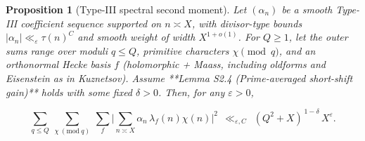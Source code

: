 \documentclass[11pt]{article}
\newtheorem{proposition}[lemma]{Proposition}
\theoremstyle{definition}
\theoremstyle{remark}
\begin{document}
\begin{proposition}[Type-III spectral second moment]\label{prop:typeIII}
	Let $(\alpha_n)$ be a smooth Type-III coefficient sequence supported on $n\asymp X$, with divisor-type bounds $|\alpha_n|\ll_\varepsilon \tau(n)^C$ and smooth weight of width $X^{1+o(1)}$. For $Q\ge 1$, let the outer sums range over moduli $q\le Q$, primitive characters $\chi\pmod q$, and an orthonormal Hecke basis $f$ (holomorphic + Maass, including oldforms and Eisenstein as in Kuznetsov). Assume **Lemma S2.4 (Prime-averaged short-shift gain)** holds with some fixed $\delta>0$. Then, for any $\varepsilon>0$,

	$$
		\sum_{q\le Q}\ \sum_{\chi\ (\mathrm{mod}\ q)}\ \sum_{f}
		\Bigg|\sum_{n\asymp X}\alpha_n\,\lambda_f(n)\chi(n)\Bigg|^2
		\ \ \ll_{\varepsilon,C}\ \ (Q^2+X)^{\,1-\delta}\,X^{\varepsilon}.
	$$

\end{proposition}
\end{document}
